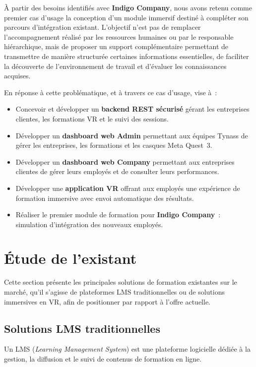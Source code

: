 À partir des besoins identifiés avec \textbf{Indigo Company}, nous avons retenu
comme premier cas d'usage la conception d'un module immersif destiné à compléter
son parcours d'intégration existant. L'objectif n'est pas de remplacer
l'accompagnement réalisé par les ressources humaines ou par le responsable
hiérarchique, mais de proposer un support complémentaire permettant de transmettre
de manière structurée certaines informations essentielles, de faciliter la
découverte de l'environnement de travail et d'évaluer les connaissances acquises.

En réponse à cette problématique, et à travers ce cas d'usage, \tynassit{} vise à~:

\begin{itemize}
  \item Concevoir et développer un \textbf{backend REST sécurisé} gérant les entreprises
    clientes, les formations VR et le suivi des sessions.
  \item Développer un \textbf{dashboard web Admin} permettant aux équipes Tynass de gérer
    les entreprises, les formations et les casques Meta Quest~3.
  \item Développer un \textbf{dashboard web Company} permettant aux entreprises clientes
    de gérer leurs employés et de consulter leurs performances.
  \item Développer une \textbf{application VR} offrant aux employés une expérience
    de formation immersive avec envoi automatique des résultats.
  \item Réaliser le premier module de formation pour \textbf{Indigo Company}~:
    simulation d'intégration des nouveaux employés.
\end{itemize}

\section{Étude de l'existant}

Cette section présente les principales solutions de formation existantes sur le marché,
qu'il s'agisse de plateformes LMS traditionnelles ou de solutions immersives en VR, afin
de positionner \tynassit{} par rapport à l'offre actuelle.

\subsection{Solutions LMS traditionnelles}

Un LMS (\textit{Learning Management System}) est une plateforme logicielle dédiée à la
gestion, la diffusion et le suivi de contenus de formation en ligne.


